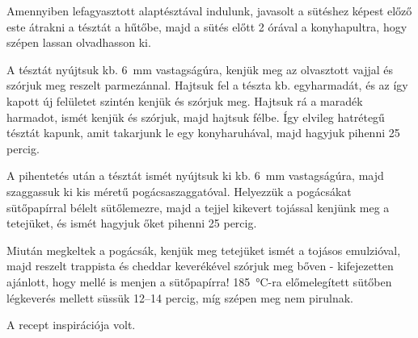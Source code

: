 Amennyiben lefagyasztott alaptésztával indulunk, javasolt a sütéshez képest előző este átrakni a tésztát a hűtőbe, majd a sütés előtt 2 órával a konyhapultra, hogy szépen lassan olvadhasson ki.

A tésztát nyújtsuk kb. \qty{6}{\mm} vastagságúra, kenjük meg az olvasztott vajjal és szórjuk meg reszelt parmezánnal. Hajtsuk fel a tészta kb. egyharmadát, és az így kapott új felületet szintén kenjük és szórjuk meg. Hajtsuk rá a maradék harmadot, ismét kenjük és szórjuk, majd hajtsuk félbe. Így elvileg hatrétegű tésztát kapunk, amit takarjunk le egy konyharuhával, majd hagyjuk pihenni 25 percig.

A pihentetés után a tésztát ismét nyújtsuk ki kb. \qty{6}{\mm} vastagságúra, majd szaggassuk ki kis méretű pogácsaszaggatóval. Helyezzük a pogácsákat sütőpapírral bélelt sütőlemezre, majd a tejjel kikevert tojással kenjünk meg a tetejüket, és ismét hagyjuk őket pihenni 25 percig.

Miután megkeltek a pogácsák, kenjük meg tetejüket ismét a tojásos emulzióval, majd reszelt trappista és cheddar keverékével szórjuk meg bőven - kifejezetten ajánlott, hogy mellé is menjen a sütőpapírra! \qty{185}{\celsius}-ra előmelegített sütőben légkeverés mellett süssük \numrange[range-phrase=-]{12}{14} percig, míg szépen meg nem pirulnak.

A recept inspirációja \cite{szabi_pogi} volt.
 